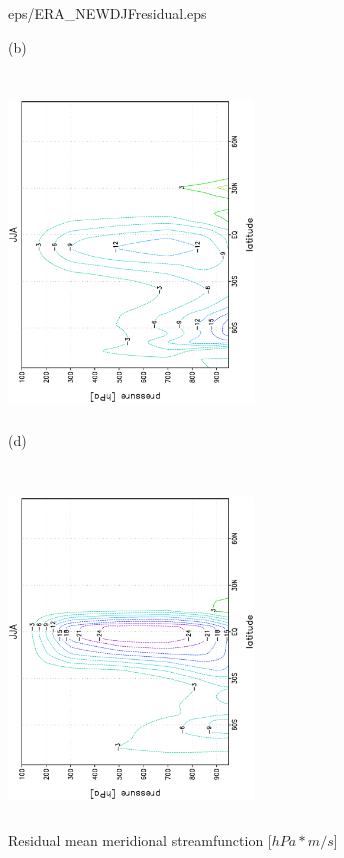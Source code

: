 \documentclass[12pt,a4paper,twoside,openright,headinclude,liststotoc,bibtotoc]{scrreprt}
\begin{document}
\begin{figure}[b]
{{eps/ERA_NEWDJFresidual.eps}
}
\parbox{8.5cm}{\hspace{1.05cm}\begin{scriptsize}(b)\end{scriptsize} \vspace{-0.5cm} \\
\includegraphics[height=8.5cm,width=6.5cm,angle=-90]
{eps/NEWtmJJAresidual.eps}
}
\parbox{8.5cm}{\hspace{1.05cm}\begin{scriptsize}(d)\end{scriptsize} \vspace{-0.55cm} \\
\includegraphics[height=8.7cm,width=6.5cm,angle=-90]
{eps/ERA_NEWJJAresidual.eps}
}
\caption[Residual mean meridional streamfunction]{Residual mean meridional streamfunction [$hPa*m/s$]}
\label{img:resi}
\end{figure}
\end{document}
